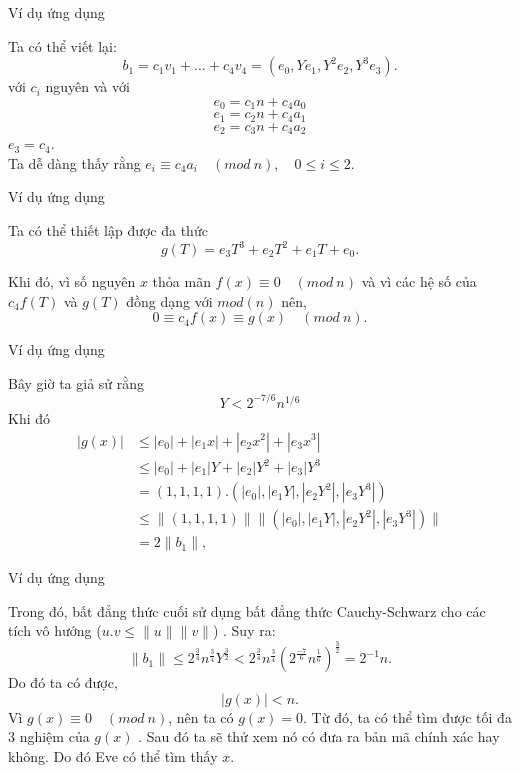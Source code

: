 \documentclass{beamer}
\numberwithin{equation}{section}
\begin{document}
\begin{frame}{Ví dụ ứng dụng}

Ta có thể viết lại:
$$b_1 = c_1v_1 + \dots + c_4v_4 = (e_0, Ye_1, Y^2e_2, Y^3e_3)\text{.}$$
với $c_i$ nguyên và với $$e_0 = c_1n + c_4a_0$$ $$e_1 = c_2n + c_4a_1$$ $$e_2 = c_3n + c_4a_2$$
\hspace*{7cm} $e_3 = c_4$.\\
Ta dễ dàng thấy rằng $e_i \equiv c_4a_i\quad (mod \ n), \quad 0\leq i\leq 2$. \\

\end{frame}
\begin{frame}{Ví dụ ứng dụng}

Ta có thể thiết lập được đa thức $$g(T) = e_3T^3 + e_2T^2 + e_1T + e_0\text{.}$$

Khi đó, vì số nguyên $x$ thỏa mãn $f(x) \equiv 0 \quad (mod \ n) $ và vì các hệ số của $c_4f(T)$ và $g(T)$ đồng dạng với $mod(n)$ nên, $$0 \equiv c_4f(x) \equiv g(x) \quad (mod \ n)\text{.}$$

\end{frame}
\begin{frame}{Ví dụ ứng dụng}

Bây giờ ta giả sử rằng $$Y < 2^{-7/6}n^{1/6}$$
Khi đó $$
\begin{aligned}
|g(x)| & \leq |e_0|+|e_1x|+|e_2x^2|+|e_3x^3|\\
& \leq |e_0| + |e_1|Y + |e_2|Y^2 + |e_3|Y^3\\
& = (1, 1, 1, 1).(|e_0|, |e_1Y|, |e_2Y^2|, |e_3Y^3|)\\
&\leq \|(1, 1, 1, 1)\|\|(|e_0|, |e_1Y|, |e_2Y^2|, |e_3Y^3|)\| \\
& = 2\|b_1\|\text{,}
\end{aligned}
$$

\end{frame}
\begin{frame}{Ví dụ ứng dụng}

Trong đó, bất đẳng thức cuối sử dụng bất đẳng thức Cauchy-Schwarz cho các tích vô hướng  ($u.v \leq \|u\|\|v\|$) . Suy ra: $$\|b_1\| \leq 2^{\tfrac{3}{4}}n^{\tfrac{3}{4}}Y^{\tfrac{3}{2}} < 2^{\tfrac{3}{4}}n^{\tfrac{3}{4}}(2^{\tfrac{-7}{6}}n^{\tfrac{1}{6}})^{\tfrac{3}{2}} = 2^{-1}n \text{.}$$
Do đó ta có được, $$|g(x)| < n.$$
Vì $g(x) \equiv 0 \quad (mod \ n)$, nên ta có $g(x) = 0$. Từ đó, ta có thể tìm được tối đa 3 nghiệm của $g(x)$ . Sau đó ta sẽ thử xem nó có đưa ra bản mã chính xác hay không. Do đó Eve có thể tìm thấy $x$.\\

\end{frame}
\end{document}

